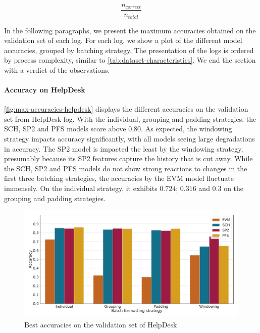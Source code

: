 $$\frac{n_{correct}}{n_{total}} $$

In the following paragraphs, we present the maximum accuracies obtained on the validation set of each log.
For each log, we show a plot of the different model accuracies, grouped by batching strategy.
The presentation of the logs is ordered by process complexity, similar to \autoref{tab:dataset-characteristics}.
We end the section with a verdict of the observations.\\

\paragraph{Accuracy on HelpDesk}
\autoref{fig:max-accuracies-helpdesk} displays the different accuracies on the validation set from HelpDesk log.
With the individual, grouping and padding strategies, the SCH, SP2 and PFS models score above $0.80$.
As expected, the windowing strategy impacts accuracy significantly, with all models seeing large degradations in accuracy.
The SP2 model is impacted the least by the windowing strategy, presumably because its SP2 features capture the history that is cut away.
While the SCH, SP2 and PFS models do not show strong reactions to changes in the first three batching strategies, the accuracies by the EVM model fluctuate immensely.
On the individual strategy, it exhibits $0.724$; $0.316$ and $0.3$ on the grouping and padding strategies.

\begin{figure}[!htb]
    \centering
    \includegraphics[width=\textwidth]{gfx/helpdesk/accuracies.pdf}
    \caption{Best accuracies on the validation set of HelpDesk}
    \label{fig:max-accuracies-helpdesk}
\end{figure}

